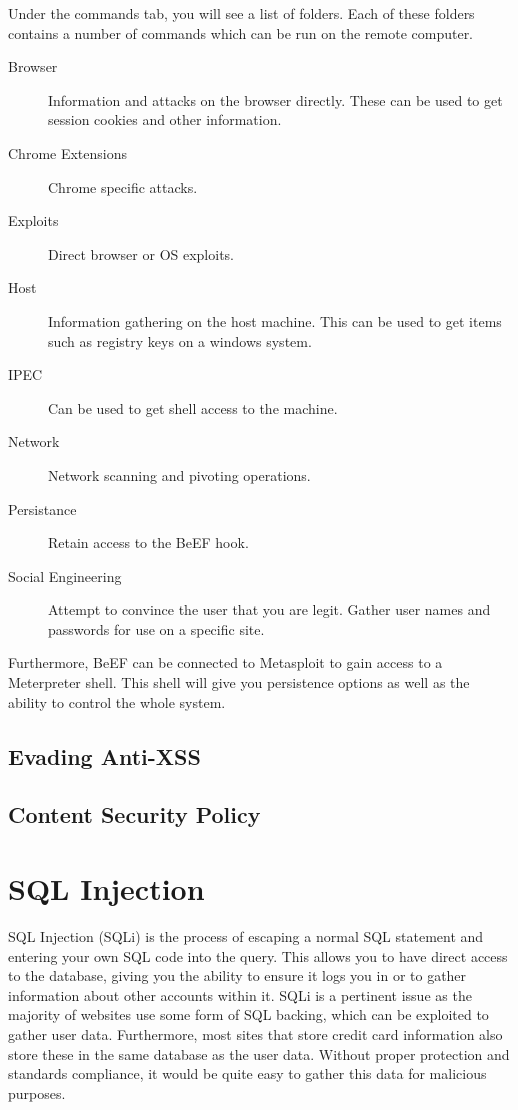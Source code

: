 \documentclass[a4paper,11pt]{report}
\begin{document}
				Under the commands tab, you will see a list of folders. 
				Each of these folders contains a number of commands which can be run on the remote computer. 
				\begin{description}
					\item[Browser] Information and attacks on the browser directly. 
						These can be used to get session cookies and other information. 
					\item[Chrome Extensions] Chrome specific attacks. 
					\item[Exploits] Direct browser or OS exploits. 
					\item[Host] Information gathering on the host machine. 
						This can be used to get items such as registry keys on a windows system. 
					\item[IPEC] Can be used to get shell access to the machine. 
					\item[Network] Network scanning and pivoting operations. 
					\item[Persistance] Retain access to the BeEF hook. 
					\item[Social Engineering] Attempt to convince the user that you are legit. 
						Gather user names and passwords for use on a specific site. 
				\end{description}

				Furthermore, BeEF can be connected to Metasploit to gain access to a Meterpreter shell. 
				This shell will give you persistence options as well as the ability to control the whole system. 
			\subsection{Evading Anti-XSS}
			\subsection{Content Security Policy}
	\section{SQL Injection}
		SQL Injection (SQLi) is the process of escaping a normal SQL statement and entering your own SQL code into the query. 
		This allows you to have direct access to the database, giving you the ability to ensure it logs you in or to gather information about other accounts within it. 
		SQLi is a pertinent issue as the majority of websites use some form of SQL backing, which can be exploited to gather user data. 
		Furthermore, most sites that store credit card information also store these in the same database as the user data. 
		Without proper protection and standards compliance, it would be quite easy to gather this data for malicious purposes. 
\end{document}
